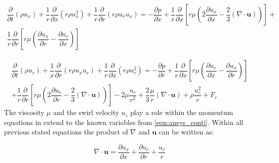 \documentclass[../thesis.tex]{subfiles}
\begin{document}
\begin{gather}
	\dfrac{\partial}{\partial t}(\rho u_x) + \dfrac{1}{r} \dfrac{\partial}{\partial x}(r \rho u_x^2)
	+ \dfrac{1}{r} \dfrac{\partial}{\partial r}(r \rho u_r u_x) = 
	- \dfrac{\partial p}{\partial x} + \dfrac{1}{r} \dfrac{\partial }{\partial x} \left[ 
	r \mu \left( 2 \dfrac{\partial u_x}{\partial x} - \dfrac{2}{3}(\nabla \cdot \mathbf{u}) \right)
	\right] + \\ \nonumber
	\dfrac{1}{r} \dfrac{\partial }{\partial r} \left[ 
	r \mu \left( \dfrac{\partial u_x}{\partial r} - \dfrac{\partial u_r}{\partial x} \right)
	\right]	
\end{gather}


\begin{gather}
	\dfrac{\partial}{\partial t}(\rho u_r) + \dfrac{1}{x} \dfrac{\partial}{\partial r}(r \rho u_x u_r)
	+ \dfrac{1}{r} \dfrac{\partial}{\partial x}(r \rho u_r^2) = 
	- \dfrac{\partial p}{\partial r} + \dfrac{1}{r} \dfrac{\partial }{\partial x} \left[ 
	r \mu \left( \dfrac{\partial u_r}{\partial x} - \dfrac{\partial u_x}{\partial r} \right)
	\right] \\ \nonumber
	+ \dfrac{1}{r} \dfrac{\partial }{\partial r} \left[ 
	r \mu \left( 2 \dfrac{\partial u_r}{\partial r} - \dfrac{2}{3}(\nabla \cdot \mathbf{u}) \right)
	\right] -
	2 \mu \dfrac{u_r}{r^2}+ \dfrac{2}{3} \dfrac{\mu}{r}(\nabla \cdot \mathbf{u}) + \rho \dfrac{u_z^2}{r} + F_r
\end{gather}
The viscosity $\mu$ and the swirl velocity $u_z$ play a role within the momentum equations in extend to the known variables from \autoref{eqn:ansys_conti}.
Within all previous stated equations the product of $\nabla$ and $\mathbf{u}$ can be written as:

\begin{equation}
	\nabla \cdot \mathbf{u} = \dfrac{\partial u_x}{\partial x} + \dfrac{\partial u_r}{\partial r}+ \dfrac{u_r}{r}
\end{equation}
 
\end{document}
